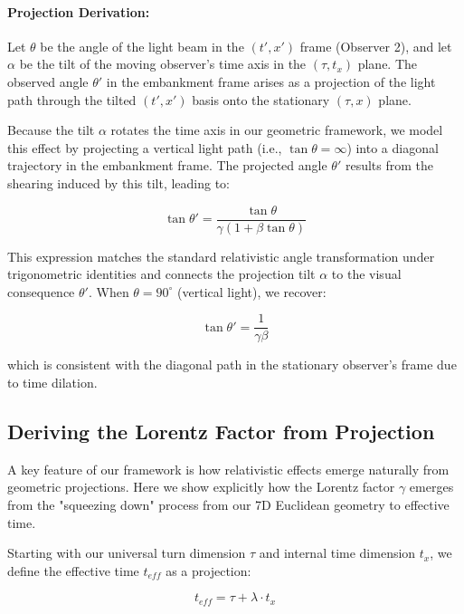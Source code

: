 \documentclass{article}
\begin{document}
\paragraph{Projection Derivation:} Let $\theta$ be the angle of the light beam in the $(t', x')$ frame (Observer 2), and let $\alpha$ be the tilt of the moving observer’s time axis in the $(\tau, t_x)$ plane. The observed angle $\theta'$ in the embankment frame arises as a projection of the light path through the tilted $(t', x')$ basis onto the stationary $(\tau, x)$ plane.

Because the tilt $\alpha$ rotates the time axis in our geometric framework, we model this effect by projecting a vertical light path (i.e., $\tan\theta = \infty$) into a diagonal trajectory in the embankment frame. The projected angle $\theta'$ results from the shearing induced by this tilt, leading to:

\begin{equation}
\tan\theta' = \frac{\tan\theta}{\gamma(1 + \beta \tan\theta)}
\end{equation}

This expression matches the standard relativistic angle transformation under trigonometric identities and connects the projection tilt $\alpha$ to the visual consequence $\theta'$. When $\theta = 90^\circ$ (vertical light), we recover:

\begin{equation}
\tan\theta' = \frac{1}{\gamma\beta}
\end{equation}

which is consistent with the diagonal path in the stationary observer's frame due to time dilation.

\subsection{Deriving the Lorentz Factor from Projection}

A key feature of our framework is how relativistic effects emerge naturally from geometric projections. Here we show explicitly how the Lorentz factor $\gamma$ emerges from the "squeezing down" process from our 7D Euclidean geometry to effective time.

Starting with our universal turn dimension $\tau$ and internal time dimension $t_x$, we define the effective time $t_{eff}$ as a projection:

\begin{equation}
t_{eff} = \tau + \lambda \cdot t_x
\end{equation}
\end{document}
